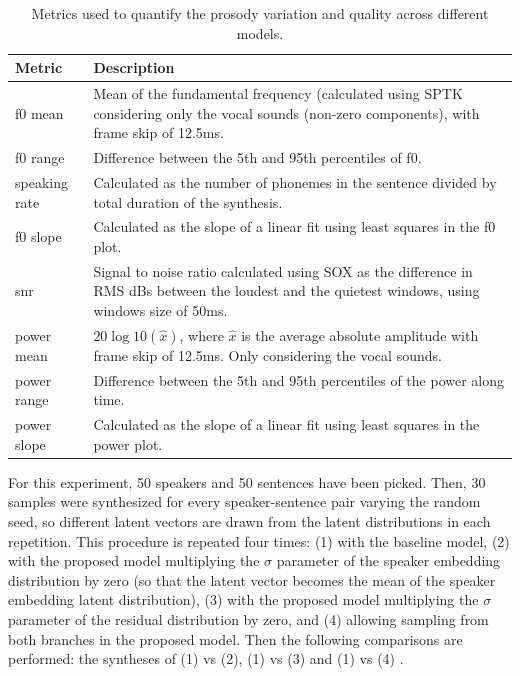 \begin{table}
	\scriptsize
		\centering
	\caption{Metrics used to quantify the prosody variation and quality across different models.}
	\begin{tabular}{p{}|p{}}
		\toprule
		Metric & Description \\
		\midrule
		f0 mean &  Mean of the fundamental frequency (calculated using SPTK \autocite{sptk} considering only the vocal sounds (non-zero components), with frame skip of 12.5ms.\\
		f0 range & Difference between the 5th and 95th percentiles of f0. \\
		speaking rate & Calculated as the number of phonemes in the sentence divided by total duration of the synthesis. \\
		f0 slope & Calculated as the slope of a linear fit using least squares in the f0 plot. \\
		snr & Signal to noise ratio calculated using SOX \autocite{SOX} as the difference in RMS dBs between the loudest and the quietest windows, using windows size of 50ms. \\
		power mean & $20\log10(\hat{x})$, where $\hat{x}$ is the average absolute amplitude with frame skip of 12.5ms. Only considering the vocal sounds. \\
		power range & Difference between the 5th and 95th percentiles of the power along time. \\
		power slope & Calculated as the slope of a linear fit using least squares in the power plot. \\
		\bottomrule
	\end{tabular}
	\label{tab:metrics}
\end{table}

For this experiment, 50 speakers and 50 sentences have been picked. Then, 30 samples were synthesized for every speaker-sentence pair varying the random seed, so different latent vectors are drawn from the latent distributions in each repetition. This procedure is repeated four times: (1) with the baseline model, (2) with the proposed model multiplying the $\sigma$ parameter of the speaker embedding distribution by zero (so that the latent vector becomes the mean of the speaker embedding latent distribution), (3) with the proposed model multiplying the $\sigma$ parameter of the residual distribution by zero, and (4) allowing sampling from both branches in the proposed model. Then the following comparisons are performed: the syntheses of (1) vs (2), (1) vs (3) and (1) vs (4) .

